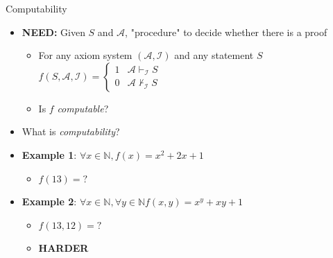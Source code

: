 \documentclass[usenames,dvipsnames]{beamer}
\newcommand{\NN}{\mathbb{N}}
\newcommand{\cA}{\mathcal{A}}
\newcommand{\cI}{\mathcal{I}}
\begin{document}
\begin{frame}{Computability}
    \begin{itemize}
        \item \textbf{NEED:} Given $S$ and $\cA$, "procedure" to decide whether there is a proof
        \begin{itemize}
            \item For any axiom system $(\cA,\cI)$ and any statement $S$
            $ f(S,\cA,\cI) = 
            \begin{cases} 
                1 & \cA\vdash_\cI S \\
                0 & \cA\nvdash_\cI S  
            \end{cases}
            $
            \item Is $f$ \emph{computable}?
        \end{itemize}
        \item What is \emph{computability}?
        \item \textbf{Example 1}: $\forall x\in\NN, f(x) = x^2 + 2x + 1$
        \begin{itemize}
            \item $f(13) = ?$
        \end{itemize}
        \item \textbf{Example 2}: $\forall x\in\NN,\forall y\in\NN f(x,y) = x^y + xy + 1$
        \begin{itemize}
            \item $f(13,12) = ?$
            \item \bf HARDER
        \end{itemize}
    \end{itemize}
\end{frame}
\end{document}
